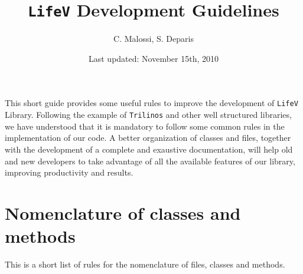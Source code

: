 \documentclass[a4paper]{article}
\title{\texttt{LifeV} Development Guidelines}
\author{C. Malossi, S. Deparis}
\date{Last updated: November 15th, 2010}
\begin{document}
\maketitle

This short guide provides some useful rules to improve the development of \texttt{LifeV} Library. Following the example of \texttt{Trilinos} and other well structured libraries, we have understood that it is mandatory to follow some common rules in the implementation of our code. A better organization of classes and files, together with the development of a complete and exaustive documentation, will help old and new developers to take advantage of all the available features of our library, improving productivity and results.

\section{Nomenclature of classes and methods}
This is a short list of rules for the nomenclature of files, classes and methods.
\end{document}
